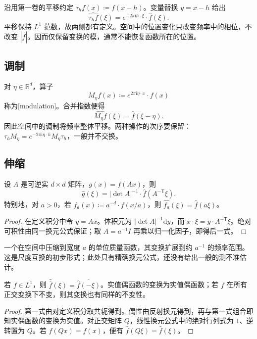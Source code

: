 沿用第一卷的平移约定 \(\tau_hf(x)\coloneqq f(x-h)\)。变量替换 \(y=x-h\) 给出
\[
 \widehat{\tau_hf}(\xi)=e^{-2\pi\mathrm{i}h\cdot\xi}\cdot\widehat f(\xi).
\]
平移保持 \(L^1\) 范数，故两侧都有定义。空间中的位置变化只改变频率中的相位，不改变 \(|\widehat f|\)。因而仅保留变换的模，通常不能恢复函数所在的位置。

\subsection{调制}
\label{b2:subsec:030103}

对 \(\eta\in\mathbb R^d\)，算子
\[
 M_\eta f(x)\coloneqq e^{2\pi\mathrm{i}\eta\cdot x}\cdot f(x)
\]
称为[modulation]。合并指数便得
\[
 \widehat{M_\eta f}(\xi)=\widehat f(\xi-\eta).
\]
因此空间中的调制将频率整体平移。两种操作的次序要保留：\(\tau_hM_\eta=e^{-2\pi\mathrm{i}\eta\cdot h}M_\eta\tau_h\)，一般并不交换。

\subsection{伸缩}
\label{b2:subsec:030104}

\begin{proposition}\label{b2:prop:03-linear-change}
设 \(A\) 是可逆实 \(d\times d\) 矩阵，\(g(x)=f(Ax)\)，则
\[
 \widehat g(\xi)=|\det A|^{-1}\cdot\widehat f(A^{-\mathsf T}\xi).
\]
特别地，对 \(a>0\)，若 \(f_a(x)\coloneqq a^{-d}\cdot f(x/a)\)，则 \(\widehat{f_a}(\xi)=\widehat f(a\xi)\)。
\end{proposition}
\begin{proof}
在定义积分中令 \(y=Ax\)。体积元为 \(|\det A|^{-1}\mathrm{d}y\)，而 \(x\cdot\xi=y\cdot A^{-\mathsf T}\xi\)。绝对可积性由同一换元公式保证；取 \(A=a^{-1}I\) 再乘以归一化因子，即得后一式。
\end{proof}

一个在空间中压缩到宽度 \(a\) 的单位质量函数，其变换扩展到约 \(a^{-1}\) 的频率范围。这是尺度互换的初步形式；此处只有精确换元公式，还没有给出一般的测不准估计。


\begin{proposition}\label{b2:prop:03-symmetries}
若 \(f\in L^1\)，则 \(\widehat{\overline f}(\xi)=\overline{\widehat f(-\xi)}\)。实值偶函数的变换为实值偶函数；若 \(f\) 在所有正交变换下不变，则其变换也有同样的不变性。
\end{proposition}
\begin{proof}
第一式由对定义积分取共轭得到。偶性由反射换元得到，再与第一式组合即知实偶函数的变换为实值。对正交矩阵 \(Q\)，线性换元公式中的绝对行列式为 \(1\)、逆转置为 \(Q\)。若 \(f(Qx)=f(x)\)，便有 \(\widehat f(Q\xi)=\widehat f(\xi)\)。
\end{proof}

